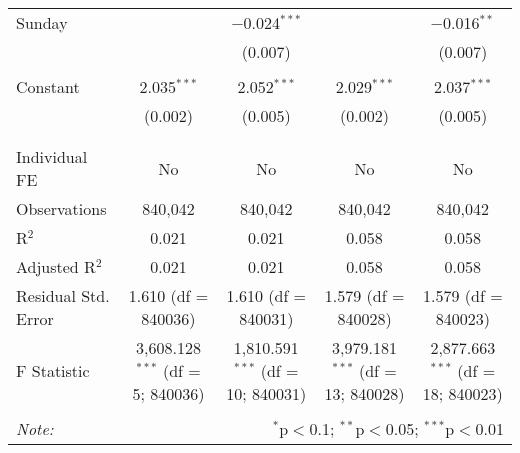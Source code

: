 \documentclass[
]{article}
\begin{document}
\begin{table}[!htbp]
{\begin{tabular}{@{\extracolsep{5pt}}lcccc}
 Sunday &  & $-$0.024$^{***}$ &  & $-$0.016$^{**}$ \\ 
  &  & (0.007) &  & (0.007) \\ 
  & & & & \\ 
 Constant & 2.035$^{***}$ & 2.052$^{***}$ & 2.029$^{***}$ & 2.037$^{***}$ \\ 
  & (0.002) & (0.005) & (0.002) & (0.005) \\ 
  & & & & \\ 
\hline \\[-1.8ex] 
Individual FE & No & No & No & No \\ 
Observations & 840,042 & 840,042 & 840,042 & 840,042 \\ 
R$^{2}$ & 0.021 & 0.021 & 0.058 & 0.058 \\ 
Adjusted R$^{2}$ & 0.021 & 0.021 & 0.058 & 0.058 \\ 
Residual Std. Error & 1.610 (df = 840036) & 1.610 (df = 840031) & 1.579 (df = 840028) & 1.579 (df = 840023) \\ 
F Statistic & 3,608.128$^{***}$ (df = 5; 840036) & 1,810.591$^{***}$ (df = 10; 840031) & 3,979.181$^{***}$ (df = 13; 840028) & 2,877.663$^{***}$ (df = 18; 840023) \\ 
\hline 
\hline \\[-1.8ex] 
\textit{Note:}  & \multicolumn{4}{r}{$^{*}$p$<$0.1; $^{**}$p$<$0.05; $^{***}$p$<$0.01} \\ 
\end{tabular}
} 
\end{table} 
\newpage
\end{document}
